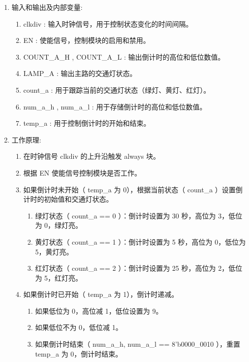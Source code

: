 \documentclass[a4,10pt,zihao=-4]{ctexart}
\begin{document}
\begin{enumerate}
  \item 输入和输出及内部变量:
  \begin{enumerate}
      \item  clkdiv : 输入时钟信号，用于控制状态变化的时间间隔。
      \item  EN : 使能信号，控制模块的启用和禁用。
      \item  COUNT\_A\_H ,  COUNT\_A\_L : 输出倒计时的高位和低位数值。
      \item  LAMP\_A : 输出主路的交通灯状态。
      \item  count\_a : 用于跟踪当前的交通灯状态（绿灯、黄灯、红灯）。
      \item  num\_a\_h ,  num\_a\_l : 用于存储倒计时的高位和低位数值。
      \item  temp\_a : 用于控制倒计时的开始和结束。
  \end{enumerate}
  \item 工作原理:
  \begin{enumerate}
      \item 在时钟信号  clkdiv  的上升沿触发  always  块。
      \item 根据  EN  使能信号控制模块是否工作。
      \item 如果倒计时未开始（ temp\_a  为 0），根据当前状态（ count\_a ）设置倒计时的初始值和交通灯状态。
        \begin{enumerate}
            \item 绿灯状态（ count\_a == 0 ）：倒计时设置为 30 秒，高位为 3，低位为 0，绿灯亮。
            \item 黄灯状态（ count\_a == 1 ）：倒计时设置为 5 秒，高位为 0，低位为 5，黄灯亮。
            \item 红灯状态（ count\_a == 2 ）：倒计时设置为 25 秒，高位为 2，低位为 5，红灯亮。
        \end{enumerate}
      \item 如果倒计时已开始（ temp\_a  为 1），倒计时递减。
        \begin{enumerate}
            \item 如果低位为 0，高位减 1，低位设置为 9。
            \item 如果低位不为 0，低位减 1。
            \item 如果倒计时结束（ {num\_a\_h, num\_a\_l} == 8'b0000\_0010 ），重置  temp\_a  为 0，倒计时结束。
         \end{enumerate}
  \end{enumerate}

\end{enumerate}
\end{document}
